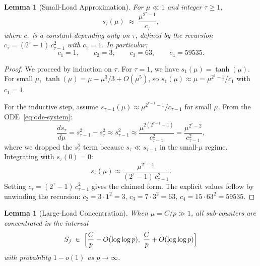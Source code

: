 \documentclass[11pt,a4paper]{article}
\newtheorem{lemma}[theorem]{Lemma}
\begin{document}
\begin{lemma}[Small-Load Approximation]\label{lem:small-load}
For $\mu \ll 1$ and integer $\tau \ge 1$,
\begin{equation}\label{eq:small-load}
  s_\tau(\mu)
  \;\approx\;
  \frac{\mu^{2^\tau - 1}}{c_\tau},
\end{equation}
where $c_\tau$ is a constant depending only on $\tau$, defined by the
recursion $c_\tau = (2^\tau - 1)\,c_{\tau-1}^2$ with $c_1 = 1$.
In particular:
\begin{equation}\label{eq:c-tau-values}
  c_1 = 1, \qquad c_2 = 3, \qquad c_3 = 63, \qquad c_4 = 59535.
\end{equation}
\end{lemma}

\begin{proof}
We proceed by induction on $\tau$.  For $\tau = 1$, we have
$s_1(\mu) = \tanh(\mu)$.  For small $\mu$, $\tanh(\mu) = \mu - \mu^3/3
+ O(\mu^5)$, so $s_1(\mu) \approx \mu = \mu^{2^1 - 1}/c_1$ with
$c_1 = 1$.

For the inductive step, assume $s_{\tau-1}(\mu) \approx
\mu^{2^{\tau-1}-1}/c_{\tau-1}$ for small $\mu$.
From the ODE~\eqref{eq:ode-system}:
\begin{equation}\label{eq:ode-inductive}
  \frac{ds_\tau}{d\mu}
  = s_{\tau-1}^2 - s_\tau^2
  \approx s_{\tau-1}^2
  \approx \frac{\mu^{2(2^{\tau-1}-1)}}{c_{\tau-1}^2}
  = \frac{\mu^{2^{\tau}-2}}{c_{\tau-1}^2},
\end{equation}
where we dropped the $s_\tau^2$ term because $s_\tau \ll s_{\tau-1}$ in
the small-$\mu$ regime.  Integrating with $s_\tau(0) = 0$:
\begin{equation}\label{eq:s-tau-approx}
  s_\tau(\mu)
  \approx \frac{\mu^{2^\tau - 1}}{(2^\tau - 1)\,c_{\tau-1}^2}.
\end{equation}
Setting $c_\tau = (2^\tau - 1)\,c_{\tau-1}^2$ gives the claimed form.
The explicit values follow by unwinding the recursion:
$c_2 = 3 \cdot 1^2 = 3$,
$c_3 = 7 \cdot 3^2 = 63$,
$c_4 = 15 \cdot 63^2 = 59535$.
\end{proof}

\begin{lemma}[Large-Load Concentration]\label{lem:large-load}
When $\mu = C/p \gg 1$, all sub-counters are concentrated in the interval
\begin{equation}\label{eq:concentration}
  S_j \;\in\; \Bigl[\frac{C}{p} - O(\log\log p),\;
  \frac{C}{p} + O(\log\log p)\Bigr]
\end{equation}
with probability $1 - o(1)$ as $p \to \infty$.
\end{lemma}
\end{document}

